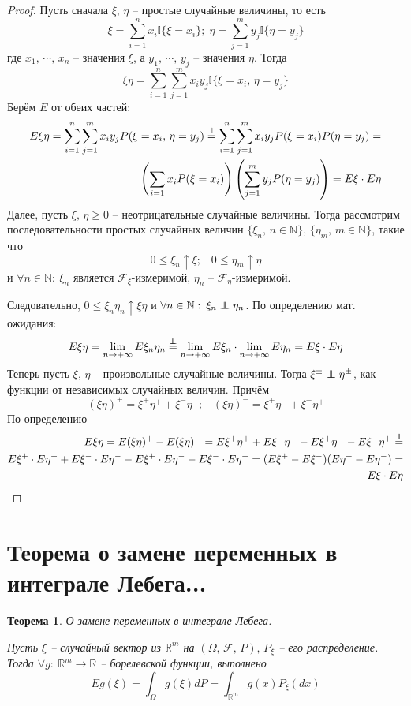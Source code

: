 \documentclass[a4paper,12pt]{article}
\renewcommand{\leq}{\ensuremath{\leqslant}}
\renewcommand{\geq}{\ensuremath{\geqslant}}
\newcommand\independent{\protect\mathpalette{\protect\independenT}{\perp}}
\def\independenT#1#2{\mathrel{\rlap{$#1#2$}\mkern2mu{#1#2}}}
\theoremstyle{plain}
\newtheorem{theorem}{Теорема}[section]
\theoremstyle{definition}
\theoremstyle{remark}
\begin{document}
\begin{proof}
  Пусть сначала $\xi,\, \eta$ -- простые случайные величины, то есть
  \[\xi = \sum_{i = 1}^n x_i\mathbb{I}\{\xi = x_i\};\; \eta = \sum_{j = 1}^m y_j\mathbb{I}\{\eta = y_j\}\]
  где $x_1,\,\cdots,\,x_n$ -- значения $\xi$, а $y_1,\,\cdots,\,y_j$ -- значения $\eta$. Тогда
  \[\xi\eta = \sum_{i = 1}^n\sum_{j = 1}^m x_iy_j \mathbb{I}\{\xi = x_i,\, \eta = y_j\}\]
  Берём $E$ от обеих частей:
  \begin{align*}
    E\xi\eta = \sum_{i = 1}^n\sum_{j = 1}^m x_iy_j P(\xi = x_i,\, \eta = y_j) \stackrel{\independent}{=} \sum_{i = 1}^n\sum_{j = 1}^m x_iy_j P(\xi = x_i)P(\eta = y_j) = \\
    \left(\sum_{i = 1}x_iP(\xi = x_i)\right)\left(\sum_{j = 1}^my_jP(\eta = y_j)\right) = E\xi\cdot E\eta
  \end{align*}
  Далее, пусть $\xi,\,\eta \geq 0$ -- неотрицательные случайные величины. Тогда рассмотрим последовательности простых случайных величин $\{\xi_n,\, n \in \mathbb{N}\},\, \{\eta_m,\, m \in \mathbb{N}\}$, такие что
  \[0 \leq \xi_n \uparrow \xi ;\;\;\; 0 \leq \eta_m \uparrow \eta\]
  и $\forall n \in \mathbb{N}:\: \xi_n$ является $\mathcal{F}_\xi$-измеримой, $\eta_n$ -- $\mathcal{F}_\eta$-измеримой.

  Следовательно, $0 \leq \xi_n\eta_n \uparrow \xi\eta$ и $\forall n \in \mathbb{N}:\: \xi_n \independent \eta_n$. По определению мат. ожидания:
  \[E\xi\eta = \lim_{n \to +\infty} E\xi_n\eta_n \stackrel{\independent}{=} \lim_{n \to +\infty}E\xi_n\cdot \lim_{n \to +\infty}E\eta_n = E\xi\cdot E\eta\]
  Теперь пусть $\xi,\, \eta$ -- произвольные случайные величины. Тогда $\xi^\pm \independent \eta^\pm$, как функции от независимых случайных величин. Причём
  \[(\xi\eta)^+ = \xi^+\eta^+ + \xi^-\eta^- ;\;\;\; (\xi\eta)^- = \xi^+\eta^- + \xi^-\eta^+\]
  По определению
  \begin{align*}
    E\xi\eta = E(\xi\eta)^+ - E(\xi\eta)^- = E\xi^+\eta^+ + E\xi^-\eta^- - E\xi^+\eta^- - E\xi^-\eta^+ \stackrel{\independent}{=} \\
    E\xi^+\cdot E\eta^+ + E\xi^-\cdot E\eta^- - E\xi^+ \cdot E\eta^- - E\xi^-\cdot E\eta^+ = (E\xi^+ - E\xi^-)(E\eta^+ - E\eta^-) = \\
    E\xi \cdot E\eta
  \end{align*}
\end{proof}

\section{Теорема о замене переменных в интеграле Лебега...}
\begin{theorem}
  О замене переменных в интеграле Лебега.

  Пусть $\xi$ -- случайный вектор из $\mathbb{R}^m$ на $(\Omega,\, \mathcal{F},\,P),\, P_\xi$ -- его распределение. Тогда $\forall g:\: \mathbb{R}^m \to \mathbb{R}$ -- борелевской функции, выполнено
  \[Eg(\xi) = \int_\Omega g(\xi)dP = \int_{\mathbb{R}^m}g(x)P_\xi(dx)\]
\end{theorem}
\end{document}
